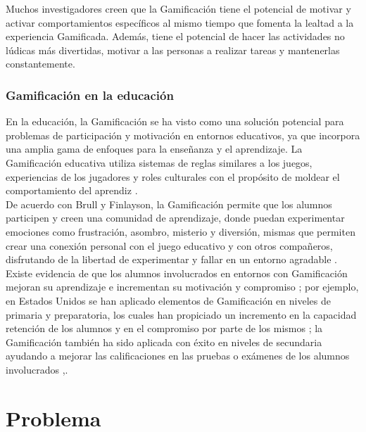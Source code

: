 \noindent Muchos investigadores creen que la Gamificación tiene el potencial de motivar y activar comportamientos específicos al mismo tiempo que fomenta la lealtad a la experiencia Gamificada. Además, tiene el potencial de hacer las actividades no lúdicas más divertidas, motivar a las personas a realizar tareas y mantenerlas constantemente. \cite{Aldemir}
\clearpage


\subsubsection{Gamificación en la educación}

En la educación, la Gamificación se ha visto como una solución potencial para problemas de participación y motivación en entornos educativos, ya que incorpora una amplia gama de enfoques para la enseñanza y el aprendizaje. La Gamificación educativa utiliza sistemas de reglas similares a los juegos, experiencias de los jugadores y roles culturales con el propósito de moldear el comportamiento del aprendiz \cite{Aldemir}.\\
    
\noindent De acuerdo con Brull y Finlayson, la Gamificación permite que los alumnos participen y creen una comunidad de aprendizaje, donde puedan experimentar emociones como frustración, asombro, misterio y diversión, mismas que permiten crear una conexión personal con el juego educativo y con otros compañeros, disfrutando de la libertad de experimentar y fallar en un entorno agradable \cite{BrullFinlayson}.\\

\noindent Existe evidencia de que los alumnos involucrados en entornos con Gamificación mejoran su aprendizaje e incrementan su motivación y compromiso \cite{ChuHung}; por ejemplo, en Estados Unidos se han aplicado elementos de Gamificación en niveles de primaria y preparatoria, los cuales han propiciado un incremento en la capacidad retención de los alumnos y en el compromiso por parte de los mismos \cite{BrullFinlayson}; la Gamificación también ha sido aplicada con éxito en niveles de secundaria ayudando a mejorar las calificaciones en las pruebas o exámenes de los alumnos involucrados \cite{UPIICSA},\cite{Admiraal}.\\


\clearpage

\section{Problema}
\label{sec:problematica}

